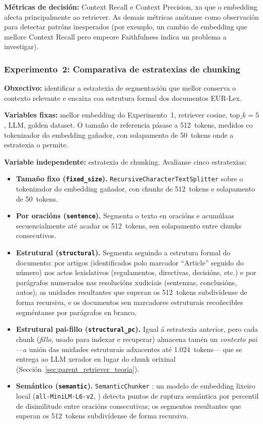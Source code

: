 \documentclass[11pt, a4paper, oneside]{report}
\begin{document}
\textbf{Métricas de decisión:} Context Recall e Context Precision, xa que o embedding
afecta principalmente ao retriever. As demais métricas anótanse como observación para
detectar patróns inesperados (por exemplo, un cambio de embedding que mellore Context
Recall pero empeore Faithfulness indica un problema a investigar).

\subsubsection{Experimento~2: Comparativa de estratexias de chunking}
\label{sec:exp2_chunking}

\textbf{Obxectivo:} identificar a estratexia de segmentación que mellor conserva o
contexto relevante e encaixa coa estrutura formal dos documentos EUR-Lex.

\textbf{Variables fixas:} mellor embedding do Experimento~1, retriever cosine,
$\text{top}\_k = 5$, LLM, golden dataset. O tamaño de referencia pásase a
512~tokens, medidos co tokenizador do embedding gañador, con solapamento de
50~tokens onde a estratexia o permite.

\textbf{Variable independente:} estratexia de chunking. Avalíanse cinco estratexias:

\begin{itemize}
  \item \textbf{Tamaño fixo (\texttt{fixed\_size}).} \texttt{RecursiveCharacterTextSplitter}
    sobre o tokenizador do embedding gañador, con chunks de 512~tokens e
    solapamento de 50~tokens.
  \item \textbf{Por oracións (\texttt{sentence}).} Segmenta o texto en oracións
    e acumúlaas secuencialmente até acadar os 512~tokens, sen solapamento entre
    chunks consecutivos.
  \item \textbf{Estrutural (\texttt{structural}).} Segmenta seguindo a estrutura
    formal do documento: por artigos (identificados polo marcador \enquote{Article}
    seguido do número) nos actos lexislativos
    (regulamentos, directivas, decisións, etc.) e por parágrafos numerados nas
    resolucións xudiciais (sentenzas, conclusións, autos); as unidades resultantes
    que superan os 512~tokens subdivídense de forma recursiva, e os documentos sen
    marcadores estruturais recoñecibles segméntanse por parágrafos en branco.
  \item \textbf{Estrutural pai-fillo (\texttt{structural\_pc}).} Igual á estratexia
    anterior, pero cada chunk (\textit{fillo}, usado para indexar e recuperar)
    almacena tamén un \textit{contexto pai} —a unión das unidades estruturais
    adxacentes até 1.024~tokens— que se entrega ao LLM xerador en lugar do chunk
    orixinal (Sección~\ref{sec:parent_retriever_teoria}).
  \item \textbf{Semántico (\texttt{semantic}).} \texttt{SemanticChunker}
    \citep{kamradt2023semantic}: un modelo de embedding lixeiro local
    (\texttt{all-MiniLM-L6-v2}, \citealt{reimers2019sentence}) detecta puntos de
    ruptura semántica por percentil de disimilitude entre oracións consecutivas;
    os segmentos resultantes que superan os 512~tokens subdivídense de forma
    recursiva.
\end{itemize}
\end{document}
